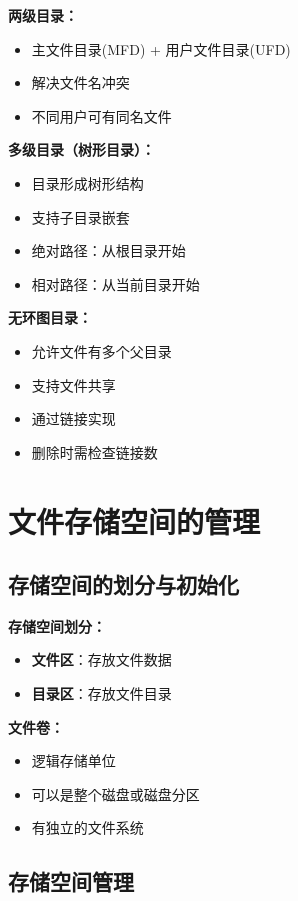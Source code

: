\documentclass[lang=cn,newtx,10pt,scheme=chinese]{../../elegantbook}
\begin{document}
\textbf{两级目录：}
\begin{itemize}
  \item 主文件目录(MFD) + 用户文件目录(UFD)
  \item 解决文件名冲突
  \item 不同用户可有同名文件
\end{itemize}

\textbf{多级目录（树形目录）：}
\begin{itemize}
  \item 目录形成树形结构
  \item 支持子目录嵌套
  \item 绝对路径：从根目录开始
  \item 相对路径：从当前目录开始
\end{itemize}

\textbf{无环图目录：}
\begin{itemize}
  \item 允许文件有多个父目录
  \item 支持文件共享
  \item 通过链接实现
  \item 删除时需检查链接数
\end{itemize}

\section{文件存储空间的管理}

\subsection{存储空间的划分与初始化}

\textbf{存储空间划分：}
\begin{itemize}
  \item \textbf{文件区}：存放文件数据
  \item \textbf{目录区}：存放文件目录
\end{itemize}

\textbf{文件卷：}
\begin{itemize}
  \item 逻辑存储单位
  \item 可以是整个磁盘或磁盘分区
  \item 有独立的文件系统
\end{itemize}

\subsection{存储空间管理}
\end{document}
